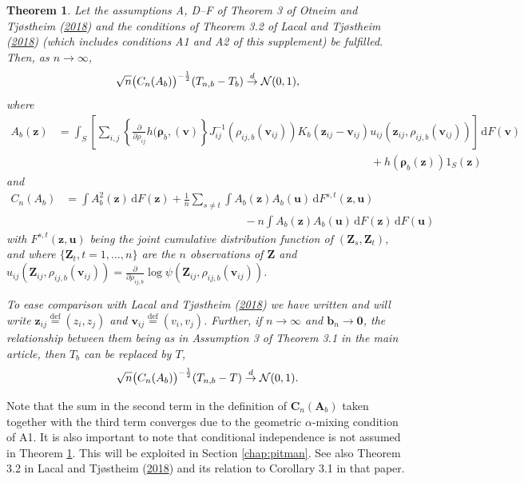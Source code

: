 \documentclass[
  12pt,
  letterpaper]{article}
\newtheorem{thm}{Theorem}[section]
\numberwithin{equation}{section}
\newcommand{\Z}{\bm{Z}}
\newcommand{\z}{\bm{z}}
\newcommand{\fv}{\bm{v}}
\newcommand{\fu}{\bm{u}}
\newcommand{\fC}{\bm{C}}
\newcommand{\fA}{\bm{A}}
\newcommand{\frho}{\bm{\rho}}
\newcommand{\bb}{\bm{b}}
\newcommand{\di}{\,\textrm{d}}
\begin{document}
\begin{thm} 
Let the assumptions A, D--F of Theorem 3 of Otneim and Tjøstheim (\protect\hyperlink{ref-otneim2017conditional}{2018}) and the conditions of Theorem 3.2 of Lacal and Tjøstheim (\protect\hyperlink{ref-lacal2018estimating}{2018}) (which includes conditions A1 and A2 of this supplement) be fulfilled. Then,
as $n \to \infty$,
$$
\sqrt{n}\big(C_{n}(A_b)\big)^{-\frac{1}{2}}(T_{n,b} - T_b) \buildrel {d} \over {\to} {\cal N}(0,1),
$$
where
\begin{align*}
A_b(\z)  & = \int_{S} \left[\sum_{i,j}\left\{\frac{\partial}{\partial \rho_{ij}} h(\frho_b,(\fv)\right\}J_{ij}^{-1}(\rho_{ij,b}(\fv_{ij}))K_b(\z_{ij}- \fv_{ij})u_{ij}(\z_{ij},\rho_{ij,b}(\fv_{ij}))\right] \di F(\fv) \\
& \qquad\qquad\qquad\qquad\qquad\qquad\qquad\qquad\qquad\qquad\qquad\qquad\qquad\qquad + h(\frho_b(\z))1_S(\z)
\end{align*}
and 
\begin{align}
C_n(A_b) &= \int A_b^2(\z) \di F(\z) + \frac{1}{n}\sum_{s \neq t}\int A_b(\z)A_b(\fu) \di F^{s,t}(\z,\fu) \nonumber \\
& \qquad\qquad\qquad\qquad\qquad\qquad\qquad\qquad - n\int A_b(\z)A_b(\fu) \di F(\z) \di F(\fu)
\label{eq:t0}
\end{align}
with $F^{s,t}(\z,\fu)$ being the joint cumulative distribution function of $(\Z_s,\Z_t)$, and where $\{\Z_{t}, t=1,\ldots,n\}$ are the $n$ observations of $\Z$ and $u_{ij}(\Z_{ij}, \rho_{ij,b}(\fv_{ij})) = \frac{\partial}{\partial \rho_{ij,b}}\log\psi(\Z_{ij},\rho_{ij,b}(\fv_{ij}))$. 

To ease comparison with Lacal and Tjøstheim (\protect\hyperlink{ref-lacal2018estimating}{2018}) we have written and will write $\z_{ij} \stackrel{\textrm{def}}{=} (z_i,z_j)$ and $\fv_{ij} \stackrel{\textrm{def}}{=} (v_i,v_j)$. Further, if $n \to \infty$ and $\bb_n \to \bm{0}$, the relationship between them being as in Assumption 3 of Theorem 3.1 in the main article, then $T_b$ can be replaced by $T$,
$$
\sqrt{n}\big(C_{n}(A_b)\big)^{-\frac{1}{2}}(T_{n,b} - T) \buildrel {d} \over {\to} {\cal N}(0,1).
$$
\label{thm:F2}
\end{thm}

Note that the sum in the second term in the definition of \(\fC_n(\fA_b)\) taken together with the third term converges due to the geometric \(\alpha\)-mixing condition of A1. It is also important to note that conditional independence is not assumed in Theorem \ref{thm:F2}. This will be exploited in Section \ref{chap:pitman}. See also Theorem 3.2 in Lacal and Tjøstheim (\protect\hyperlink{ref-lacal2018estimating}{2018}) and its relation to Corollary 3.1 in that paper.
\end{document}
